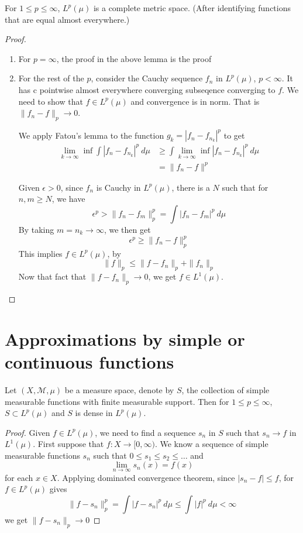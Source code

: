 \begin{theorem}
  For $1 \le p \le \infty$, $L^p(\mu)$ is a complete metric space.
  (After identifying functions that are equal almost everywhere.)
\end{theorem}
\begin{proof}
  \begin{enumerate}[label=(\arabic*)]
    \item For $p = \infty$, the proof in the above lemma is the proof
    \item For the rest of  the $p$, consider the Cauchy sequence
      $f_n$ in $L^p(\mu)$, $p < \infty$. It has c pointwise almost
      everywhere converging subseqence converging to $f$. We need to
      show that $ f \in L^p(\mu)$ and convergence is in norm. That is
      $  \|f_n - f\|_p \to 0$.

      We apply Fatou's lemma to the function $g_k = |f_n - f_{n_k}|^p$ to get
      \begin{align*}
        \lim_{k \to \infty} \inf \int |f_n - f_{n_k}|^p \ d \mu &\ge
        \int \lim_{k \to \infty} \inf |f_n - f_{n_k}|^p \ d \mu \\
        & =  \|f_n - f\|^p
      \end{align*}

      Given $\epsilon > 0$, since $f_n$ is Cauchy in $ L^p(\mu)$,
      there is a $ N$ such that for $n, m \ge N$, we have \[
        \epsilon^p > \|f_n - f_m\|^p_p = \int |f_n - f_m|^p \ d \mu
      \]
      By taking $m = n_k \to \infty$, we then get  \[
        \epsilon^p \ge \|f_n - f\|_p^p
      \]
      This implies $f \in L^p(\mu)$, by \[
        \|f\|_p \le \|f - f_n\|_p  + \|f_n\|_p
      \]
      Now that fact that $\|f - f_n\|_p \to 0$, we get $f \in L^1(\mu)$.
  \end{enumerate}
\end{proof}

\section{Approximations by simple or continuous functions}
\begin{theorem}
  Let $(X, \mathcal{M}, \mu)$ be a measure space, denote by $S$, the
  collection of simple measurable functions with finite measurable support.
  Then for $1 \le p \le \infty$, $ S \subset L^p(\mu)$ and $S$ is
  dense in $L^p(\mu)$.
\end{theorem}
\begin{proof}
  Given $f \in L^p(\mu)$, we need to find a sequence $s_n$ in $S$
  such that $s_n \to f$ in $L^1(\mu)$. First suppose that $f: X \to
  [0, \infty)$. We know a sequence of simple measurable functions
  $s_n$ such that $0 \le s_1 \le s_2 \le \ldots$ and \[
    \lim_{n \to \infty} s_n(x) = f(x)
  \]
  for each $x \in X$. Applying dominated convergence theorem, since
  $|s_n - f| \le f$, for $f \in L^p(\mu)$ gives \[
    \|f - s_n\|^p_p = \int |f - s_n|^p \ d \mu \le \int |f|^p \ d \mu < \infty
  \]
  we get $\|f - s_n\|_p \to 0$
\end{proof}


